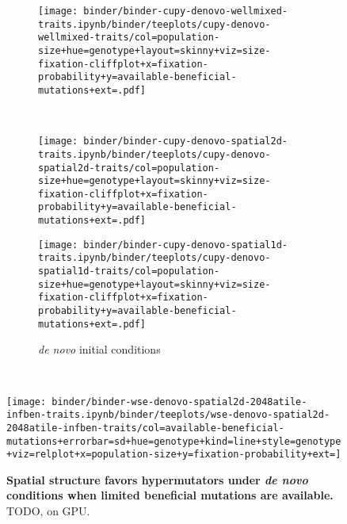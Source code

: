 \begin{figure}[h]
\begin{minipage}{\textwidth}
    \begin{subfigure}[b]{\linewidth}
        \begin{minipage}{0.3\textwidth}
          \texttt{[image: binder/binder-cupy-denovo-wellmixed-traits.ipynb/binder/teeplots/cupy-denovo-wellmixed-traits/col=population-size+hue=genotype+layout=skinny+viz=size-fixation-cliffplot+x=fixation-probability+y=available-beneficial-mutations+ext=.pdf]}%
        \end{minipage}%
        \begin{minipage}{0.06\textwidth}
          ~
        \end{minipage}%
        \begin{minipage}{0.26\textwidth}
          \texttt{[image: binder/binder-cupy-denovo-spatial2d-traits.ipynb/binder/teeplots/cupy-denovo-spatial2d-traits/col=population-size+hue=genotype+layout=skinny+viz=size-fixation-cliffplot+x=fixation-probability+y=available-beneficial-mutations+ext=.pdf]}%
        \end{minipage}%
        \begin{minipage}{0.25\textwidth}
          \texttt{[image: binder/binder-cupy-denovo-spatial1d-traits.ipynb/binder/teeplots/cupy-denovo-spatial1d-traits/col=population-size+hue=genotype+layout=skinny+viz=size-fixation-cliffplot+x=fixation-probability+y=available-beneficial-mutations+ext=.pdf]}%
        \end{minipage}%
      \begin{minipage}{0.12\textwidth}
        \raggedright
        \large
        \caption{\textit{de novo} initial conditions}
        \label{fig:wse-inf-one:32}
      \end{minipage}%
    \end{subfigure}%

~\vspace{-1.2ex}

\texttt{[image: binder/binder-wse-denovo-spatial2d-2048atile-infben-traits.ipynb/binder/teeplots/wse-denovo-spatial2d-2048atile-infben-traits/col=available-beneficial-mutations+errorbar=sd+hue=genotype+kind=line+style=genotype+viz=relplot+x=population-size+y=fixation-probability+ext=]}

  \end{minipage}

  \begin{minipage}{\textwidth}
    \caption{%
      \textbf{Spatial structure favors hypermutators under \textit{de novo} conditions when limited beneficial mutations are available.}
      \footnotesize
      TODO, on GPU.
    }
    \label{fig:spatial-structure}
  \end{minipage}
\end{figure}
